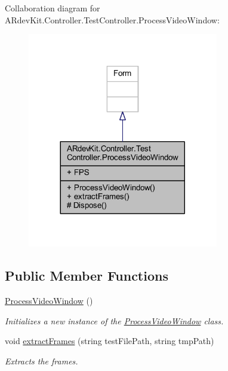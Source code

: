 Collaboration diagram for A\-Rdev\-Kit.\-Controller.\-Test\-Controller.\-Process\-Video\-Window\-:
\nopagebreak
\begin{figure}[H]
\begin{center}
\leavevmode
\includegraphics[width=236pt]{class_a_rdev_kit_1_1_controller_1_1_test_controller_1_1_process_video_window__coll__graph}
\end{center}
\end{figure}
\subsection*{Public Member Functions}
\begin{DoxyCompactItemize}
\item 
\hyperlink{class_a_rdev_kit_1_1_controller_1_1_test_controller_1_1_process_video_window_a3e7efb670402cf59c07922ba9e56b5b6}{Process\-Video\-Window} ()
\begin{DoxyCompactList}\small\item\em Initializes a new instance of the \hyperlink{class_a_rdev_kit_1_1_controller_1_1_test_controller_1_1_process_video_window}{Process\-Video\-Window} class. \end{DoxyCompactList}\item 
void \hyperlink{class_a_rdev_kit_1_1_controller_1_1_test_controller_1_1_process_video_window_ac67aa1f6af8e93d55444e9a2a95fd47f}{extract\-Frames} (string test\-File\-Path, string tmp\-Path)
\begin{DoxyCompactList}\small\item\em Extracts the frames. \end{DoxyCompactList}\end{DoxyCompactItemize}
